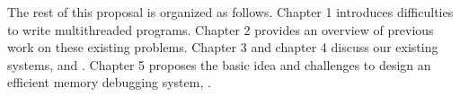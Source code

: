 \begin{itemize}

\end{itemize}

The rest of this proposal is organized as follows. Chapter 1 introduces 
difficulties to write multithreaded programs. 
Chapter 2 provides an overview of previous work on these existing problems. 
Chapter 3 and chapter 4 discuss our existing systems, \sheriff{} and \dthreads{}.
Chapter 5 proposes the basic idea and challenges to design an efficient memory debugging system, \stopgap{}. 


